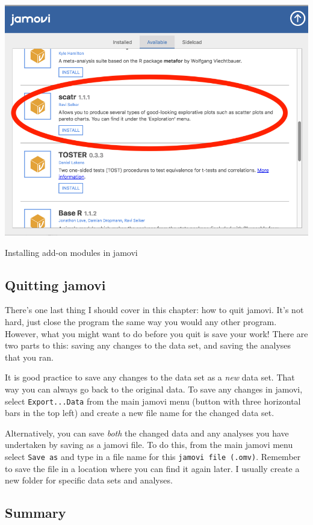 \documentclass[
]{book}
\begin{document}
\includegraphics[width=0.75\linewidth]{img/modules}

\caption{Installing add-on modules in jamovi}

\hypertarget{quitting-jamovi}{%
\subsection{Quitting jamovi}\label{quitting-jamovi}}

There's one last thing I should cover in this chapter: how to quit jamovi. It's not hard, just close the program the same way you would any other program. However, what you might want to do before you quit is save your work! There are two parts to this: saving any changes to the data set, and saving the analyses that you ran.

It is good practice to save any changes to the data set as a \emph{new} data set. That way you can always go back to the original data. To save any changes in jamovi, select \texttt{Export...Data} from the main jamovi menu (button with three horizontal bars in the top left) and create a new file name for the changed data set.

Alternatively, you can save \emph{both} the changed data and any analyses you have undertaken by saving as a jamovi file. To do this, from the main jamovi menu select \texttt{Save\ as} and type in a file name for this \texttt{jamovi\ file\ (.omv)}. Remember to save the file in a location where you can find it again later. I usually create a new folder for specific data sets and analyses.

\hypertarget{summary}{%
\subsection{Summary}\label{summary}}
\end{document}
